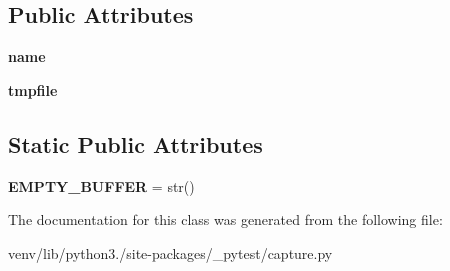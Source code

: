 \subsection*{Public Attributes}
\begin{DoxyCompactItemize}
\item 
\mbox{\label{class__pytest_1_1capture_1_1_sys_capture_aa40dfd74e86119b0426b6fa1705294b4}} 
{\bfseries name}
\item 
\mbox{\label{class__pytest_1_1capture_1_1_sys_capture_a6372e3905ce2c0298e077dfbc3300499}} 
{\bfseries tmpfile}
\end{DoxyCompactItemize}
\subsection*{Static Public Attributes}
\begin{DoxyCompactItemize}
\item 
\mbox{\label{class__pytest_1_1capture_1_1_sys_capture_ae7b2ca2c1c8b9cf3390c908587d160d4}} 
{\bfseries E\+M\+P\+T\+Y\+\_\+\+B\+U\+F\+F\+ER} = str()
\end{DoxyCompactItemize}


The documentation for this class was generated from the following file\+:\begin{DoxyCompactItemize}
\item 
venv/lib/python3./site-\/packages/\+\_\+pytest/capture.\+py\end{DoxyCompactItemize}
